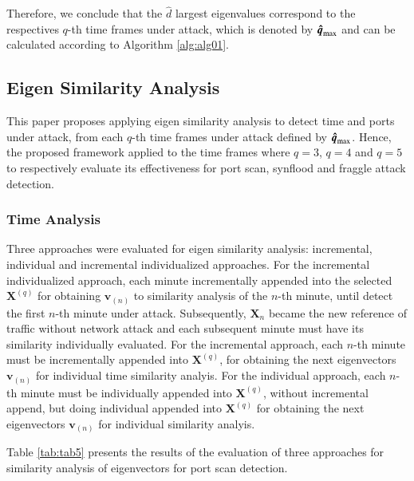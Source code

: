 \documentclass[review]{elsarticle}
\providecommand{\DIFaddtex}[1]{{\protect\color{blue}\uwave{#1}}} %
\providecommand{\DIFaddbegin}{} %
\providecommand{\DIFaddend}{} %
\providecommand{\DIFadd}[1]{\texorpdfstring{\DIFaddtex{#1}}{#1}} %
\begin{document}
Therefore, we conclude that the $\hat{d}$ largest eigenvalues correspond to the respectives $q$-th time frames under attack, which is denoted by $\rm{\boldsymbol{\hat{q}}}_{\rm max}$ and can be calculated according to Algorithm \ref{alg:alg01}.

\subsection{Eigen Similarity Analysis}
\label{sec:EigenSimilarityAnalysis}

This paper proposes applying eigen similarity analysis to detect time and ports under attack, from each $q$-th time frames under attack defined by $\rm{\boldsymbol{\hat{q}}}_{\rm max}$. Hence, the proposed framework \DIFaddbegin \DIFadd{is }\DIFaddend applied to the time frames where $q=3$, $q=4$ and $q=5$ to respectively evaluate its effectiveness for port scan, synflood and fraggle attack detection.

\subsubsection{Time Analysis}
\label{sec:TimeAnalysis}

Three approaches were evaluated for eigen similarity analysis: incremental, individual and incremental individualized approaches. For the incremental individualized approach, each minute \DIFaddbegin \DIFadd{is }\DIFaddend incrementally appended into the selected $\boldsymbol{X}^{(q)}$ for obtaining $\boldsymbol{v}_{(n)}$ to similarity analysis of the $n$-th minute, until detect the first $n$-th minute under attack. Subsequently, $\boldsymbol{X}_n$ became the new reference of traffic without network attack and each subsequent minute must have its similarity individually evaluated. For the incremental approach, each $n$-th minute must be incrementally appended into $\boldsymbol{X}^{(q)}$, for obtaining the next eigenvectors $\boldsymbol{v}_{(n)}$ for individual time similarity analyis. For the individual approach, each $n$-th minute must be individually appended into $\boldsymbol{X}^{(q)}$, without incremental append, but doing individual appended into $\boldsymbol{X}^{(q)}$ for obtaining the next eigenvectors $\boldsymbol{v}_{(n)}$ for individual similarity analyis.

Table \ref{tab:tab5} presents the results of the evaluation of three approaches for similarity analysis of eigenvectors for port scan detection.
\end{document}
